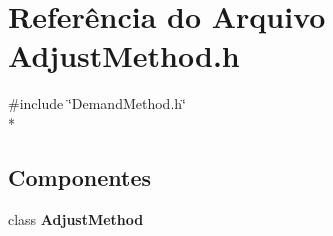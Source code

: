 \section{Referência do Arquivo Adjust\+Method.\+h}
\label{_adjust_method_8h}
{\ttfamily \#include \char`\"{}Demand\+Method.\+h\char`\"{}}\\*
\subsection*{Componentes}
\begin{DoxyCompactItemize}
\item 
class {\bf Adjust\+Method}
\end{DoxyCompactItemize}
